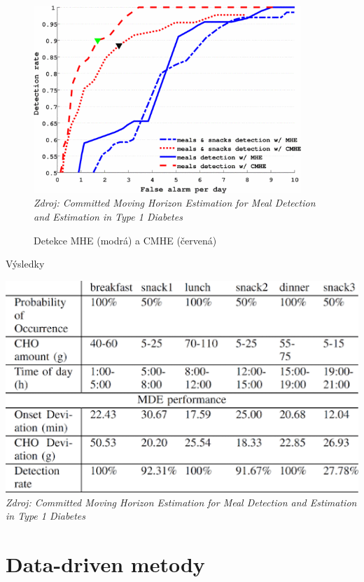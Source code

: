\begin{figure}[H]
\caption{Detekce MHE (modrá) a CMHE (červená)}
\label{fig:analyza:horizon4}
\centering
\includegraphics[width=0.9\textwidth]{img/analyzaCHO/horizon4.png}\\
\textit{Zdroj: Committed Moving Horizon Estimation for Meal Detection and Estimation in Type 1 Diabetes \citep{analyzaCHO.MovingHorizon}}
\end{figure}

\begin{table}[H]
\caption{Výsledky}
\label{tab:analyza:horizon5}
\centering
\includegraphics[width=1\textwidth]{img/analyzaCHO/horizon5.png}\\
\textit{Zdroj: Committed Moving Horizon Estimation for Meal Detection and Estimation in Type 1 Diabetes \citep{analyzaCHO.MovingHorizon}}
\end{table}


\section{Data-driven metody}
